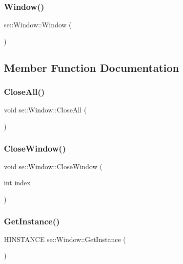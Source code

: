 \subsubsection{\texorpdfstring{Window()}{Window()}}
{\footnotesize\ttfamily se\+::\+Window\+::\+Window (\begin{DoxyParamCaption}{ }\end{DoxyParamCaption})}



\subsection{Member Function Documentation}
\mbox{\label{classse_1_1_window_aa36e57777577f2b0cf355461b3b0f9a3}} 
\subsubsection{\texorpdfstring{Close\+All()}{CloseAll()}}
{\footnotesize\ttfamily void se\+::\+Window\+::\+Close\+All (\begin{DoxyParamCaption}{ }\end{DoxyParamCaption})}

\mbox{\label{classse_1_1_window_aab3319947ce4e9cd78f16cd9be9481e5}} 
\subsubsection{\texorpdfstring{Close\+Window()}{CloseWindow()}}
{\footnotesize\ttfamily void se\+::\+Window\+::\+Close\+Window (\begin{DoxyParamCaption}\item[{int}]{index }\end{DoxyParamCaption})}

\mbox{\label{classse_1_1_window_af85337c4cc5eae56412a5bbcbf471ae6}} 
\subsubsection{\texorpdfstring{Get\+Instance()}{GetInstance()}}
{\footnotesize\ttfamily H\+I\+N\+S\+T\+A\+N\+CE se\+::\+Window\+::\+Get\+Instance (\begin{DoxyParamCaption}{ }\end{DoxyParamCaption})}

